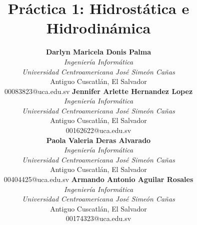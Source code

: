 \documentclass[conference]{Plantilla_LATEX/IEEEtran}
\begin{document}
\title{Práctica 1: Hidrostática e Hidrodinámica}

\author{
\begin{tabular}{@{}c@{\hspace{0.07\textwidth}}c@{}}
\parbox[t]{0.43\textwidth}{\centering
  {\normalsize\textbf{Darlyn Maricela Donis Palma}}\\
  {\small \textit{Ingeniería Informática}\\
  \textit{Universidad Centroamericana José Simeón Cañas}\\
  Antiguo Cuscatlán, El Salvador\\
  00083823@uca.edu.sv}
}
&
\parbox[t]{0.43\textwidth}{\centering
  {\normalsize\textbf{Jennifer Arlette Hernandez Lopez}}\\
  {\small \textit{Ingeniería Informática}\\
  \textit{Universidad Centroamericana José Simeón Cañas}\\
  Antiguo Cuscatlán, El Salvador\\
  00162622@uca.edu.sv}
}\\[10.0ex]
\parbox[t]{0.43\textwidth}{\centering
  {\normalsize\textbf{Paola Valeria Deras Alvarado}}\\
  {\small \textit{Ingeniería Informática}\\
  \textit{Universidad Centroamericana José Simeón Cañas}\\
  Antiguo Cuscatlán, El Salvador\\
  00404425@uca.edu.sv}
}
&
\parbox[t]{0.43\textwidth}{\centering
  {\normalsize\textbf{Armando Antonio Aguilar Rosales}}\\
  {\small \textit{Ingeniería Informática}\\
  \textit{Universidad Centroamericana José Simeón Cañas}\\
  Antiguo Cuscatlán, El Salvador\\
  00174323@uca.edu.sv}
}
\end{tabular}
}

\maketitle











\end{document}
